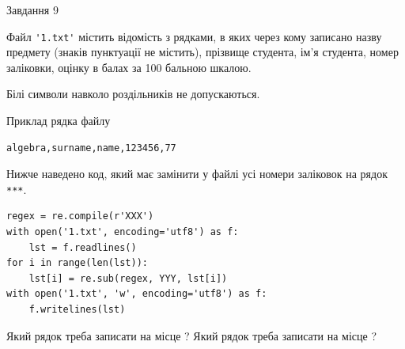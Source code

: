\documentclass[12pt, ukrainian]{article}
\def\code#1{\Verb!#1!}
\begin{document}
{\begin{minipage}[t]{8.0cm}
\end{minipage}

               
{\begin{center}Завдання {9}\end{center}}
\vspace{-4mm}
Файл \code{'1.txt'} містить відомість з рядками, в яких через кому записа\-но назву предмету (знаків пунктуації не містить), прізвище студента, ім'я студента, номер залі\-ков\-ки, оцінку в балах за 100 бальною шкалою.

Білі символи навколо роздільників не допускаються.

Приклад рядка файлу



\begin{verbatim}
algebra,surname,name,123456,77
\end{verbatim}


Нижче наведено код, який має замінити у файлі усі номери заліковок на рядок \code{***}.



\begin{verbatim}
regex = re.compile(r'XXX')
with open('1.txt', encoding='utf8') as f:
    lst = f.readlines()
for i in range(len(lst)):
    lst[i] = re.sub(regex, YYY, lst[i])
with open('1.txt', 'w', encoding='utf8') as f:
    f.writelines(lst)
\end{verbatim}





Який рядок треба записати на місце  ?
Який рядок треба записати на місце  ?\par

}
\newpage
\end{document}
